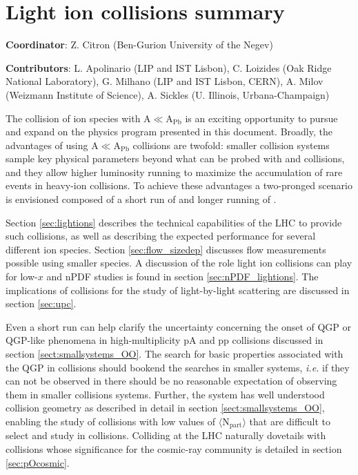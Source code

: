 \documentclass[../report.tex]{subfiles}
\begin{document}
\section{Light ion collisions summary}
\label{sec:smallAsum}
{ \small
\noindent \textbf{Coordinator}: Z. Citron (Ben-Gurion University of the Negev)

\noindent \textbf{Contributors}:
L. Apolinario (LIP and IST Lisbon),
C. Loizides (Oak Ridge National Laboratory),
G. Milhano (LIP and IST Lisbon, CERN),
A. Milov (Weizmann Institute of Science),
A. Sickles (U. Illinois, Urbana-Champaign)
}


The collision of ion species with A$\ll$A$_\mathrm{Pb}$ is an exciting opportunity to pursue and expand on the physics program presented in this document.  Broadly, the advantages of using A$\ll$A$_\mathrm{Pb}$  collisions are twofold: smaller collision systems sample key physical parameters beyond what can be probed with \PbPb and \pPb collisions, and they allow higher luminosity running to maximize the accumulation of rare events in heavy-ion collisions. 
To achieve these advantages a two-pronged scenario is envisioned composed of a short run of \OO and longer running of \ArAr.

Section \ref{sec:lightions} describes the technical capabilities of the LHC to provide such collisions, as well as describing the expected performance for several different ion species.  Section \ref{sec:flow_sizedep} discusses flow measurements possible using smaller species.  A discussion of the role light ion collisions can play for low-$x$ and nPDF studies is found in section \ref{sec:nPDF_lightions}.  The implications of \ArAr collisions for the study of light-by-light scattering are discussed in section \ref{sec:upc}. 

Even a short \OO run can help clarify the uncertainty concerning the onset of QGP or QGP-like phenomena in high-multiplicity pA and pp collisions discussed in section \ref{sect:smallsystems_OO}.  The search for basic properties associated with the QGP in \OO collisions should bookend the searches in smaller systems, \textit{i.e.} if they can not be observed in \OO there should be no reasonable expectation of observing them in smaller collisions systems.  Further, the \OO system has well understood collision geometry as described in detail in section \ref{sect:smallsystems_OO}, enabling the study of collisions with low values of $\langle \mathrm{N_{part}}\rangle$ that are difficult to select and study in \PbPb collisions.  Colliding \OO at the LHC naturally dovetails with \pO collisions whose significance for the cosmic-ray community is detailed in section \ref{sec:pOcosmic}.
\end{document}
